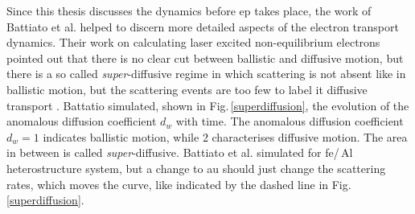 \documentclass[a4paper,12pt,twoside]{article}
\begin{document}
\noindent Since this thesis discusses the dynamics before \gls{ep} takes place, the work of Battiato et al. \cite{Battiato2012} helped to discern more detailed aspects of the electron transport dynamics. Their work on calculating laser excited non-equilibrium electrons pointed out that there is no clear cut between ballistic and diffusive motion, but there is a so called \textit{super}-diffusive regime in which scattering is not absent like in ballistic motion, but the scattering events are too few to label it diffusive transport \cite{Battiato2012}. 
Battatio simulated, shown in Fig.\,\ref{superdiffusion}, the evolution of the anomalous diffusion coefficient $d_w$ with time. The anomalous diffusion coefficient $d_w = 1$ indicates ballistic motion, while 2 characterises diffusive motion. The area in between is called \textit{super}-diffusive.
Battiato et al. \cite{Battiato2012} simulated for \gls{fe}/\,Al heterostructure system, but a change to \gls{au} should just change the scattering rates, which moves the curve, like indicated by the dashed line in Fig.\,\ref{superdiffusion}.
\end{document}
